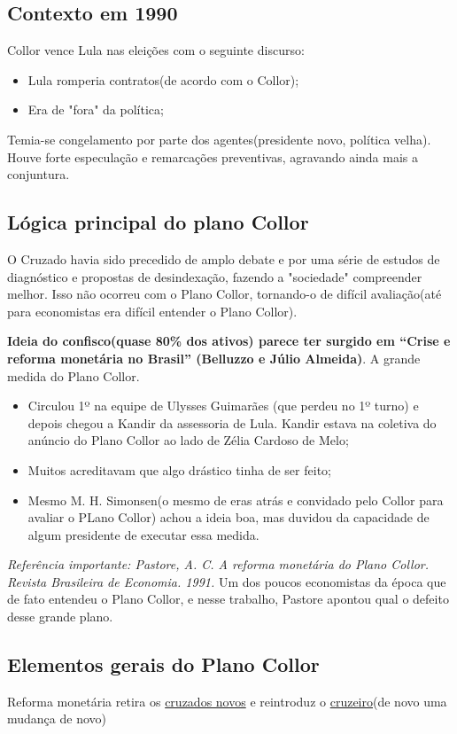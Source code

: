 \documentclass[a4paper,12pt]{article}[abntex2]
\begin{document}
\subsection{\textbf{Contexto em 1990}}
Collor vence Lula nas eleições com o seguinte discurso:
\begin{itemize}
    \item Lula romperia contratos(de acordo com o Collor);
    \item Era de "fora" da política;
\end{itemize}

Temia-se congelamento por parte dos agentes(presidente novo, política velha). Houve forte especulação e remarcações preventivas, agravando ainda mais a conjuntura.

\subsection{\textbf{Lógica principal do plano Collor}}
O Cruzado havia sido precedido de amplo debate e por uma série de estudos de diagnóstico e propostas de desindexação, fazendo a "sociedade" compreender melhor. Isso não ocorreu com o Plano Collor, tornando-o de difícil avaliação(até para economistas era difícil entender o Plano Collor).

\textbf{Ideia do confisco(quase 80\% dos ativos) parece ter surgido em “Crise e reforma monetária no Brasil” (Belluzzo e Júlio Almeida)}. A grande medida do Plano Collor.
\begin{itemize}
    \item Circulou 1º na equipe de Ulysses Guimarães (que perdeu no 1º turno) e depois chegou a Kandir da assessoria de Lula. Kandir estava na coletiva do anúncio do Plano Collor ao lado de Zélia Cardoso de Melo;
    \item Muitos acreditavam que algo drástico tinha de ser feito;
    \item Mesmo M. H. Simonsen(o mesmo de eras atrás e convidado pelo Collor para avaliar o PLano Collor) achou a ideia boa, mas duvidou da capacidade de algum presidente de executar essa medida.
\end{itemize}

\textit{Referência importante: Pastore, A. C. A reforma monetária do Plano Collor. Revista Brasileira de Economia. 1991.} Um dos poucos economistas da época que de fato entendeu o Plano Collor, e nesse trabalho, Pastore apontou qual o defeito desse grande plano.

\subsection{\textbf{Elementos gerais do Plano Collor}}
Reforma monetária retira os \underline{cruzados novos} e reintroduz o \underline{cruzeiro}(de novo uma mudança de novo)
\end{document}
